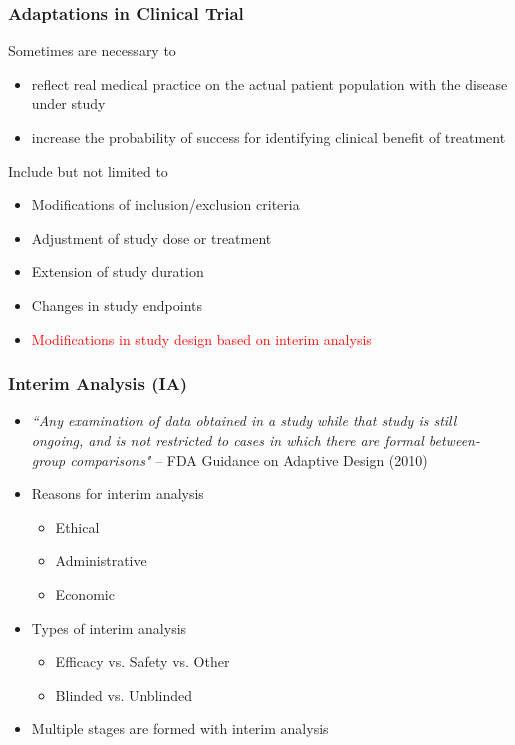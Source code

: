 \documentclass{beamer}
\begin{document}
\begin{frame}
    \frametitle{Adaptations in Clinical Trial}
Sometimes are necessary to     
    \begin{itemize}
        \item reflect real medical practice on the actual patient population with the disease under study
        \item increase the probability of success for identifying clinical benefit of treatment  
    \end{itemize}
Include but not limited to         
  \begin{itemize}
  \item Modifications of inclusion/exclusion criteria
  \item Adjustment of study dose or treatment
  \item Extension of study duration
  \item Changes in study endpoints
  \item \textcolor{red}{Modifications in study design based on interim analysis}
  \end{itemize}

\end{frame}

\begin{frame}
	\frametitle{Interim Analysis (IA)}
	\begin{itemize}
		\item \emph{``Any examination of data obtained in a study while that study is still ongoing, and is not restricted to cases in which there are formal between-group comparisons"} -- FDA Guidance on Adaptive Design (2010)
		\item Reasons for interim analysis \begin{itemize}
			\item Ethical
			\item Administrative
			\item Economic
		\end{itemize}
		\item Types of interim analysis \begin{itemize}
			\item Efficacy vs. Safety vs. Other
			\item Blinded vs. Unblinded
		\end{itemize}
		\item Multiple stages are formed with interim analysis
   		\end{itemize}
\end{frame}
\end{document}
